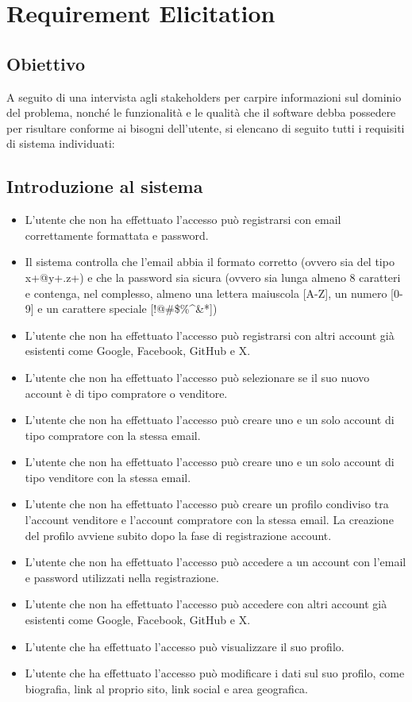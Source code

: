 
\chapter{Requirement Elicitation}
    \section{Obiettivo}
        A seguito di una intervista agli stakeholders per carpire informazioni sul dominio del problema, nonché le funzionalità e le qualità che il software debba possedere per risultare conforme ai bisogni dell'utente, si elencano di seguito tutti i requisiti di sistema individuati:
    \section{Introduzione al sistema} %
        \begin{itemize}
            \item L'utente che non ha effettuato l'accesso può registrarsi con email correttamente formattata e password.
            \item Il sistema controlla che l'email abbia il formato corretto (ovvero sia del tipo x+@y+.z+) e che la password sia sicura (ovvero sia lunga almeno 8 caratteri e contenga, nel complesso, almeno una lettera maiuscola [A-Z], un numero [0-9] e un carattere speciale [!@\#\$\%\^{}\&*])
            \item L'utente che non ha effettuato l'accesso può registrarsi con altri account già esistenti come Google, Facebook, GitHub e X.
            \item L'utente che non ha effettuato l'accesso può selezionare se il suo nuovo account è di tipo compratore o venditore.
            \item L'utente che non ha effettuato l'accesso può creare uno e un solo account di tipo compratore con la stessa email.
            \item L'utente che non ha effettuato l'accesso può creare uno e un solo account di tipo venditore con la stessa email.
            \item L'utente che non ha effettuato l'accesso può creare un profilo condiviso tra l'account venditore e l'account compratore con la stessa email. La creazione del profilo avviene subito dopo la fase di registrazione account.
            \item L'utente che non ha effettuato l'accesso può accedere a un account con l'email e password utilizzati nella registrazione.
            \item L'utente che non ha effettuato l'accesso può accedere con altri account già esistenti come Google, Facebook, GitHub e X.
            \item L'utente che ha effettuato l'accesso può visualizzare il suo profilo.
            \item L'utente che ha effettuato l'accesso può modificare i dati sul suo profilo, come biografia, link al proprio sito, link social e area geografica.
        \end{itemize}
